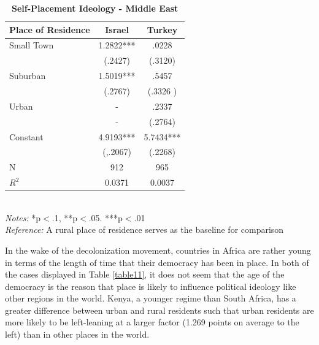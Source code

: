 \documentclass[12pt, titlepage]{article}
\newcommand\e{\emph}
\newcommand\tb{\textbf}
\begin{document}
\begin{table}[H]
	\centering
	\caption{\tb{Self-Placement Ideology - Middle East}}
	\begin{tabulary}{\linewidth}{l c c}
		\\
		\hline
		\tb{Place of Residence}&\tb{Israel} & \tb{Turkey} \\
		\hline
		Small Town&1.2822*** & .0228 \\
		&(.2427)  & (.3120)\\
		Suburban&1.5019*** &.5457 \\
		& (.2767)  & (.3326 )\\
		Urban &- & .2337\\
		&- & (.2764)\\
		Constant& 4.9193*** &5.7434*** \\
		& (,.2067)  & (.2268)\\
		N&912 & 965\\
		$R^2$&0.0371 & 0.0037 \\
		\hline 
	\end{tabulary}
\\
\e{Notes:} *p$<$.1, **p$<$.05. ***p$<$.01 \\
\e{Reference:} A rural place of residence serves as the baseline for comparison
\label{table10}
\end{table}

In the wake of the decolonization movement, countries in Africa are rather young in terms of the length of time that their democracy has been in place. In both of the cases displayed in Table \ref{table11}, it does not seem that the age of the democracy is the reason that place is likely to influence political ideology like other regions in the world. Kenya, a younger regime than South Africa, has a greater difference between urban and rural residents such that urban residents are more likely to be left-leaning at a larger factor (1.269 points on average to the left) than in other places in the world. 
\end{document}
